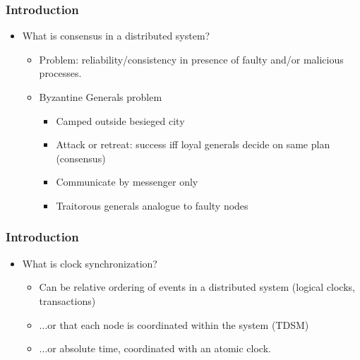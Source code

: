 \documentclass{beamer}
\begin{document}
\begin{frame}
  \frametitle{Introduction}
  \begin{itemize}
  \item<1-> What is consensus in a distributed system?
    \begin{itemize}
    \item<2-> Problem: reliability/consistency in presence of faulty
      and/or malicious processes.
    \item<3-> Byzantine Generals problem
      \begin{itemize}
      \item<4-> Camped outside besieged city
      \item<5-> Attack or retreat: success iff loyal generals decide on same plan (consensus)
      \item<6-> Communicate by messenger only
      \item<7-> Traitorous generals analogue to faulty nodes
      \end{itemize}
    \end{itemize}
  \end{itemize}
\end{frame}

\begin{frame}
  \frametitle{Introduction}
  \begin{itemize}
  \item<1-> What is clock synchronization?
    \begin{itemize}
    \item<2-> Can be relative ordering of events in a distributed system
      (logical clocks, transactions)
    \item<3-> ...or that each node is coordinated within the system (TDSM)
    \item<4-> ...or absolute time, coordinated with an atomic clock.
    \end{itemize}
  \end{itemize}
\end{frame}
\end{document}
